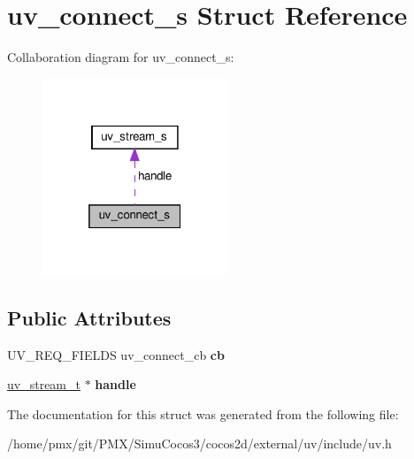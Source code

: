 \hypertarget{structuv__connect__s}{}\section{uv\+\_\+connect\+\_\+s Struct Reference}
\label{structuv__connect__s}


Collaboration diagram for uv\+\_\+connect\+\_\+s\+:
\nopagebreak
\begin{figure}[H]
\begin{center}
\leavevmode
\includegraphics[width=157pt]{structuv__connect__s__coll__graph}
\end{center}
\end{figure}
\subsection*{Public Attributes}
\begin{DoxyCompactItemize}
\item 
\mbox{\label{structuv__connect__s_af5ab3935959d23b8742fb9f202519ced}} 
U\+V\+\_\+\+R\+E\+Q\+\_\+\+F\+I\+E\+L\+DS uv\+\_\+connect\+\_\+cb {\bfseries cb}
\item 
\mbox{\label{structuv__connect__s_a6f085c22267371d57badb3d08c5cce4c}} 
\hyperlink{structuv__stream__s}{uv\+\_\+stream\+\_\+t} $\ast$ {\bfseries handle}
\end{DoxyCompactItemize}


The documentation for this struct was generated from the following file\+:\begin{DoxyCompactItemize}
\item 
/home/pmx/git/\+P\+M\+X/\+Simu\+Cocos3/cocos2d/external/uv/include/uv.\+h\end{DoxyCompactItemize}
